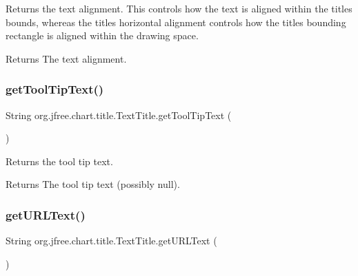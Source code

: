 Returns the text alignment. This controls how the text is aligned within the title\textquotesingle{}s bounds, whereas the title\textquotesingle{}s horizontal alignment controls how the title\textquotesingle{}s bounding rectangle is aligned within the drawing space.

\begin{DoxyReturn}{Returns}
The text alignment. 
\end{DoxyReturn}
\mbox{\label{classorg_1_1jfree_1_1chart_1_1title_1_1_text_title_a7fdc11a016087dc74a1e5ba4d467b403}} 
\subsubsection{\texorpdfstring{get\+Tool\+Tip\+Text()}{getToolTipText()}}
{\footnotesize\ttfamily String org.\+jfree.\+chart.\+title.\+Text\+Title.\+get\+Tool\+Tip\+Text (\begin{DoxyParamCaption}{ }\end{DoxyParamCaption})}

Returns the tool tip text.

\begin{DoxyReturn}{Returns}
The tool tip text (possibly {\ttfamily null}). 
\end{DoxyReturn}
\mbox{\label{classorg_1_1jfree_1_1chart_1_1title_1_1_text_title_a7640946c50c987e4830f69996841b1f6}} 
\subsubsection{\texorpdfstring{get\+U\+R\+L\+Text()}{getURLText()}}
{\footnotesize\ttfamily String org.\+jfree.\+chart.\+title.\+Text\+Title.\+get\+U\+R\+L\+Text (\begin{DoxyParamCaption}{ }\end{DoxyParamCaption})}

